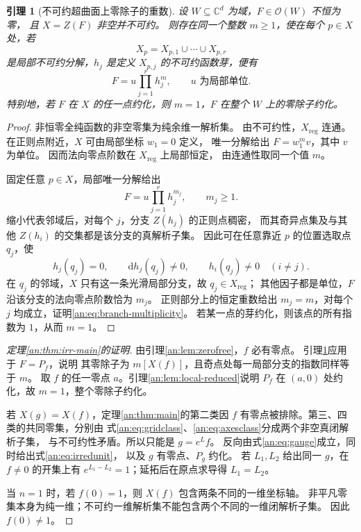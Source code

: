 \documentclass[11pt,a4paper,oneside,openany]{book}
\theoremstyle{lecture}
\newtheorem{lemma}[theorem]{引理}
\newcommand{\C}{\mathbb C}
\newcommand{\OO}{\mathcal O}
\newcommand{\dd}{\mathrm d}
\newcommand{\e}{e}
\numberwithin{equation}{section}
\begin{document}
\begin{lemma}[不可约超曲面上零除子的重数]\label{an:lem:divisor-multiplicity}
设 $W\subseteq\C^d$ 为域，$F\in\OO(W)$ 不恒为零，
且 $X=Z(F)$ 非空并不可约。
则存在同一个整数 $m\ge1$，使在每个 $p\in X$ 处，若
\[
 X_p=X_{p,1}\cup\cdots\cup X_{p,r}
\]
是局部不可约分解，$h_j$ 是定义 $X_{p,j}$ 的不可约函数芽，便有
\begin{equation}\label{an:eq:branch-multiplicity}
 F=u\prod_{j=1}^{r}h_j^{m},\qquad u\text{ 为局部单位}.
\end{equation}
特别地，若 $F$ 在 $X$ 的任一点约化，则 $m=1$，$F$ 在整个 $W$ 上的零除子约化。
\end{lemma}
\begin{proof}
非恒零全纯函数的非空零集为纯余维一解析集。
由不可约性，$X_{\mathrm{reg}}$ 连通\cite[习题6.7.3]{lebl}。
在正则点附近，$X$ 可由局部坐标 $w_1=0$ 定义，
唯一分解给出 $F=w_1^m v$，其中 $v$ 为单位。
因而法向零点阶数在 $X_{\mathrm{reg}}$ 上局部恒定，
由连通性取同一个值 $m$。

固定任意 $p\in X$，局部唯一分解\cite[定理6.4.2]{lebl}给出
\[
 F=u\prod_{j=1}^{r}h_j^{m_j},\qquad m_j\ge1.
\]
缩小代表邻域后，对每个 $j$，分支 $Z(h_j)$ 的正则点稠密，
而其奇异点集及与其他 $Z(h_i)$ 的交集都是该分支的真解析子集。
因此可在任意靠近 $p$ 的位置选取点 $q_j$，使
\[
 h_j(q_j)=0,\qquad \dd h_j(q_j)\ne0,\qquad
 h_i(q_j)\ne0\quad(i\ne j).
\]
在 $q_j$ 的邻域，$X$ 只有这一条光滑局部分支，故 $q_j\in X_{\mathrm{reg}}$；
其他因子都是单位，$F$ 沿该分支的法向零点阶数恰为 $m_j$。
正则部分上的恒定重数给出 $m_j=m$，对每个 $j$ 均成立，证明\eqref{an:eq:branch-multiplicity}。
若某一点的芽约化，则该点的所有指数为 $1$，从而 $m=1$。
\end{proof}

\begin{proof}[定理\ref{an:thm:irr-main}的证明]
由引理\ref{an:lem:zerofree}，$f$ 必有零点。
引理\ref{an:lem:divisor-multiplicity}应用于 $F=P_f$，说明
其零除子为 $m[X(f)]$，且奇点处每一局部分支的指数同样等于 $m$。
取 $f$ 的任一零点 $a$。引理\ref{an:lem:local-reduced}说明
$P_f$ 在 $(a,0)$ 处约化，故 $m=1$，整个零除子约化。

若 $X(g)=X(f)$，定理\ref{an:thm:main}的第二类因
$f$ 有零点被排除。第三、四类的共同零集，分别由
式\eqref{an:eq:gridclass}、\eqref{an:eq:axesclass}分成两个非空真闭解析子集，
与不可约性矛盾。所以只能是 $g=\e^L f$。
反向由式\eqref{an:eq:gauge}成立，同时给出式\eqref{an:eq:irredunit}，
以及 $g$ 有零点、$P_g$ 约化。
若 $L_1,L_2$ 给出同一 $g$，在 $f\ne0$ 的开集上有
$\e^{L_1-L_2}=1$；延拓后在原点求导得 $L_1=L_2$。

当 $n=1$ 时，若 $f(0)=1$，则 $X(f)$ 包含两条不同的一维坐标轴。
非平凡零集本身为纯一维；不可约一维解析集不能包含两个不同的一维闭解析子集。
因此 $f(0)\ne1$。
\end{proof}
\end{document}
